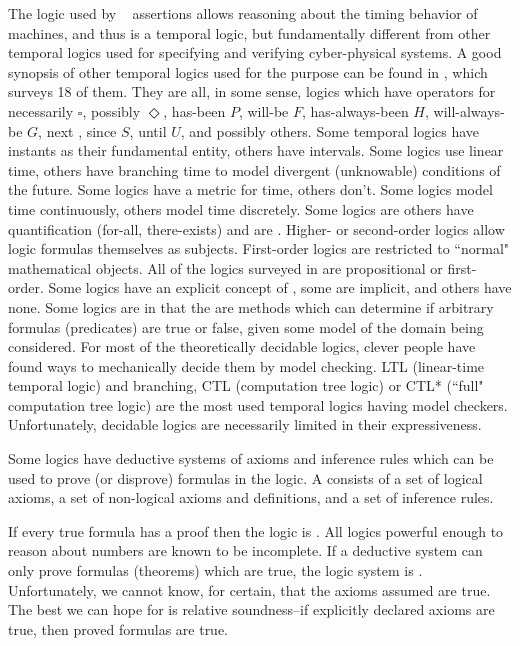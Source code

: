 
\pn The logic used by \lang~ assertions allows reasoning about the timing behavior of machines, and thus is a temporal logic, but fundamentally different from other temporal logics used for specifying and verifying cyber-physical systems.  A good synopsis of other temporal logics used for the purpose can be found in \cite{Konur-2013}, which surveys 18 of them.  They are all, in some sense,  logics which have operators for necessarily $\square$, possibly $\Diamond$, has-been $P$, will-be $F$, has-always-been $H$, will-always-be $G$, next \textbigcircle, since $S$, until $U$, and possibly others.  Some temporal logics have instants as their fundamental entity, others have intervals.  Some logics use linear time, others have branching time to model divergent (unknowable) conditions of the future.  Some logics have a metric for time, others don't.
Some logics model time continuously, others model time discretely.
Some logics are  others have quantification (for-all, there-exists) and are .  Higher- or second-order logics allow logic formulas themselves as subjects.  First-order logics are restricted to ``normal" mathematical objects.  All of the logics surveyed in \cite{Konur-2013} are propositional or first-order.
Some logics have an explicit concept of , some are implicit, and others have none.
Some logics are  in that the are methods which can determine if arbitrary formulas (predicates) are true or false, given some model of the domain being considered.  For most of the theoretically decidable logics, clever people have found ways to mechanically decide them by model checking.  LTL (linear-time temporal logic) and branching, CTL (computation tree logic) or CTL* (``full" computation tree logic) are the most used temporal logics having model checkers.
Unfortunately, decidable logics are necessarily limited in their expressiveness.

Some logics have deductive systems of axioms and inference rules which can be used to prove (or disprove) formulas in the logic. 
A  consists of a set
of logical axioms, a set 
of non-logical axioms and definitions, and a set 
of inference rules.

\pn If every true formula has a proof then the logic is .  All logics powerful enough to reason about numbers are known to be incomplete.
If a deductive system can only prove formulas (theorems) which are true, the logic system is .
Unfortunately, we cannot know, for certain, that the axioms assumed are true.  The best we can hope for is relative soundness--if explicitly declared axioms are true, then proved formulas are true.

